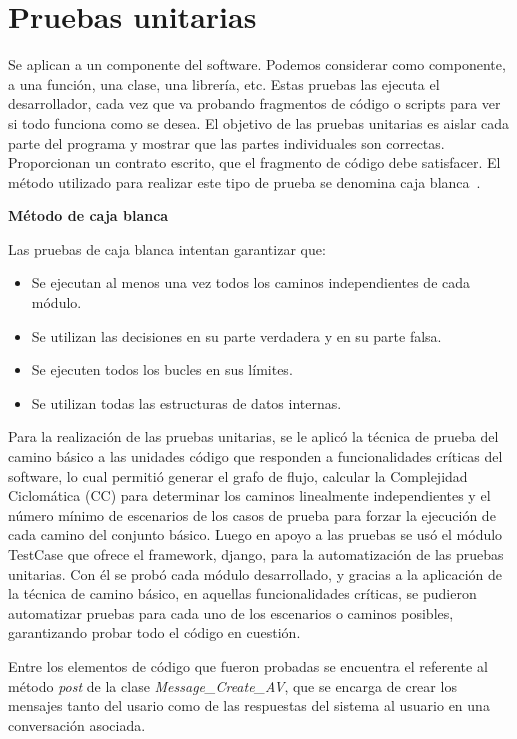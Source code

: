 \section{Pruebas unitarias}

Se aplican a un componente del software. Podemos considerar como componente, a una función, una clase,
una librería, etc. Estas pruebas las ejecuta el desarrollador, cada vez que va probando fragmentos de código
o scripts para ver si todo funciona como se desea. El objetivo de las pruebas unitarias es aislar cada parte
del programa y mostrar que las partes individuales son correctas. Proporcionan un contrato escrito, que el
fragmento de código debe satisfacer. El método utilizado para realizar este tipo de prueba se denomina caja
blanca~\cite{sommerville2011software}.

\textbf{Método de caja blanca}

Las pruebas de caja blanca intentan garantizar que:

\begin{itemize}
	\item Se ejecutan al menos una vez todos los caminos independientes de cada módulo.
	\item Se utilizan las decisiones en su parte verdadera y en su parte falsa.
	\item Se ejecuten todos los bucles en sus límites.
	\item Se utilizan todas las estructuras de datos internas.
\end{itemize}

Para la realización de las pruebas unitarias, se le aplicó la técnica de prueba del camino básico a las unidades
código que responden a funcionalidades críticas del software, lo cual permitió generar el grafo de flujo,
calcular la Complejidad Ciclomática (CC) para determinar los caminos linealmente independientes y el
número mínimo de escenarios de los casos de prueba para forzar la ejecución de cada camino del conjunto
básico.
Luego en apoyo a las pruebas se usó el módulo TestCase que ofrece el framework, django, para la automatización de las pruebas unitarias. Con él se probó cada módulo desarrollado, y gracias a la aplicación de la
técnica de camino básico, en aquellas funcionalidades críticas, se pudieron automatizar pruebas para cada
uno de los escenarios o caminos posibles, garantizando probar todo el código en cuestión.

Entre los elementos de código que fueron probadas se encuentra el referente al método \textit{post} de la clase
\textit{Message\_Create\_AV}, que se encarga de crear los mensajes tanto del usario como de las respuestas del sistema al usuario en una conversación asociada.

